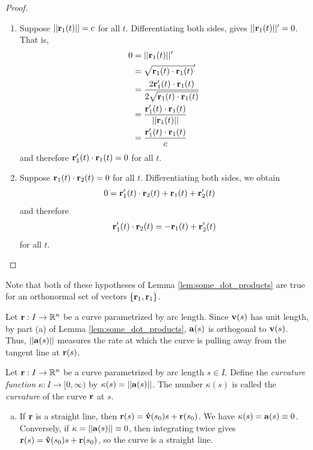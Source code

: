 \documentclass[12pt,letterpaper,reqno]{article}
\numberwithin{equation}{section}
\newcommand{\R}{\ensuremath{\mathbb R}}
\newcommand{\bv}{{\bf v}}
\newcommand{\ba}{{\bf a}}
\newcommand{\bbr}{{\bf r}}
\begin{document}
{\begin{proof}
	\begin{enumerate}[(1)]
		\item Suppose $||\bbr_1(t)||=c$ for all $t$. Differentiating both sides, gives $||\bbr_1(t)||'=0$. That is,
		\begin{align*}
			0&=||\bbr_1(t)||' \\
			&=\sqrt{\bbr_1(t) \cdot \bbr_1(t)}' \\
			&=\frac{2\bbr_1'(t) \cdot \bbr_1(t)}{2\sqrt{\bbr_1(t) \cdot \bbr_1(t)}} \\
			&=\frac{\bbr_1'(t) \cdot \bbr_1(t)}{||\bbr_1(t)||} \\
			&=\frac{\bbr_1'(t) \cdot \bbr_1(t)}{c} \\
		\end{align*}
		and therefore $\bbr_1'(t) \cdot \bbr_1(t)=0$ for all $t$.
		\item Suppose $\bbr_1(t) \cdot \bbr_2(t)=0$ for all $t$. Differentiating both sides, we obtain
		\begin{align*}
			0&=\bbr_1'(t) \cdot \bbr_2(t)+\bbr_1(t)+\bbr_2'(t)
		\end{align*}
		and therefore
		\begin{align*}
			\bbr_1'(t) \cdot \bbr_2(t)=-\bbr_1(t)+\bbr_2'(t)
		\end{align*}
		for all $t$.
	\end{enumerate}
\end{proof}

Note that both of these hypotheses of Lemma \ref{lem:some_dot_products} are true for an orthonormal set of vectors $\{\bbr_1,\bbr_1\}$.

Let $\bbr:I \to \R^n$ be a curve parametrized by arc length. Since $\bv(s)$ has unit length, by part (a) of Lemma \ref{lem:some_dot_products}, $\ba(s)$ is orthogonal to $\bv(s)$. Thus, $||\ba(s)||$ measures the rate at which the curve is pulling away from the tangent line at $\bbr(s)$.

\begin{defn}[Curvature]\label{def:curvature}
	Let $\bbr:I \to \R^n$ be a curve parametrized by arc length $s \in I$. Define the \emph{curvature function} $\kappa:I \to [0,\infty)$ by $\kappa(s)=||\ba(s)||$. The number $\kappa(s)$ is called the \emph{curvature} of the curve $\bbr$ at $s$.
	\end{defn}

\begin{example}\label{ex:line_circle}
\begin{enumerate}[(a)]
	\item If $\bbr$ is a straight line, then $\bbr(s)={\bf \hat{v}}(s_0)s+\bbr(s_0)$. We have $\kappa(s)=\ba(s)\equiv 0$. Conversely, if $\kappa=||\ba(s)||\equiv 0$, then integrating twice gives $\bbr(s)={\bf \hat{v}}(s_0)s+\bbr(s_0)$, so the curve is a straight line.


\end{enumerate}
\end{example}}
\end{document}
